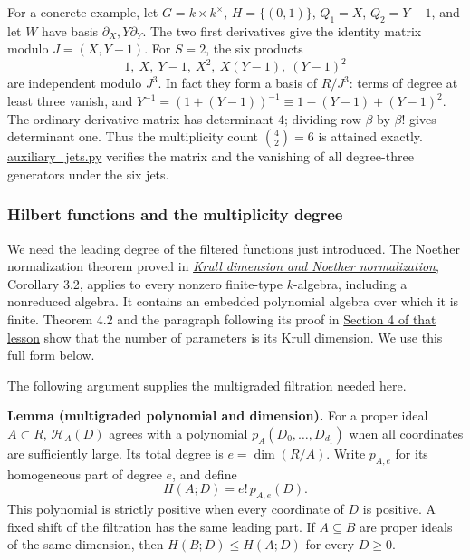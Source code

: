 \documentclass[
  11pt,
  a4paper,
]{article}
\begin{document}
For a concrete example, let \(G=k\times k^\times\), \(H=\{(0,1)\}\),
\(Q_1=X\), \(Q_2=Y-1\), and let \(W\) have basis
\(\partial_X,Y\partial_Y\). The two first derivatives give the identity
matrix modulo \(J=(X,Y-1)\). For \(S=2\), the six products \[
1,\ X,\ Y-1,\ X^2,\ X(Y-1),\ (Y-1)^2
\] are independent modulo \(J^3\). In fact they form a basis of
\(R/J^3\): terms of degree at least three vanish, and
\(Y^{-1}=(1+(Y-1))^{-1}\equiv1-(Y-1)+(Y-1)^2\). The ordinary derivative
matrix has determinant \(4\); dividing row \(\beta\) by \(\beta!\) gives
determinant one. Thus the multiplicity count \(\binom42=6\) is attained
exactly. \href{https://kokunoyumeto.github.io/open-math-courses-public/courses/TR-BAKER/verification/auxiliary_jets.py}{auxiliary\_jets.py}
verifies the matrix and the vanishing of all degree-three generators
under the six jets.

\subsubsection{Hilbert functions and the multiplicity
degree}\label{hilbert-functions-and-the-multiplicity-degree}

We need the leading degree of the filtered functions just introduced.
The Noether normalization theorem proved in
\href{https://kokunoyumeto.github.io/open-math-courses-public/courses/AG-CA/krull-dimension-and-noether-normalization.html\#3-normalization-that-respects-ideals}{\emph{Krull
dimension and Noether normalization}}, Corollary 3.2, applies to every
nonzero finite-type \(k\)-algebra, including a nonreduced algebra. It
contains an embedded polynomial algebra over which it is finite. Theorem
4.2 and the paragraph following its proof in
\href{https://kokunoyumeto.github.io/open-math-courses-public/courses/AG-CA/krull-dimension-and-noether-normalization.html\#4-parameters-measure-dimension-and-height}{Section
4 of that lesson} show that the number of parameters is its Krull
dimension. We use this full form below.

The following argument supplies the multigraded filtration needed here.

\textbf{Lemma (multigraded polynomial and dimension).} For a proper
ideal \(A\subset R\), \(\mathcal H_A(D)\) agrees with a polynomial
\(p_A(D_0,\ldots,D_{d_1})\) when all coordinates are sufficiently large.
Its total degree is \(e=\dim(R/A)\). Write \(p_{A,e}\) for its
homogeneous part of degree \(e\), and define \[
H(A;D)=e!\,p_{A,e}(D).
\tag{8.61}
\] This polynomial is strictly positive when every coordinate of \(D\)
is positive. A fixed shift of the filtration has the same leading part.
If \(A\subseteq B\) are proper ideals of the same dimension, then
\(H(B;D)\le H(A;D)\) for every \(D\ge0\).
\end{document}
